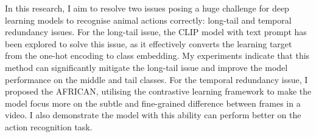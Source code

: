 In this research, I aim to resolve two issues posing a huge challenge for deep learning models to recognise animal actions correctly: long-tail and temporal redundancy issues. For the long-tail issue, the CLIP model with text prompt has been explored to solve this issue, as it effectively converts the learning target from the one-hot encoding to class embedding. My experiments indicate that this method can significantly mitigate the long-tail issue and improve the model performance on the middle and tail classes. For the temporal redundancy issue, I proposed the AFRICAN, utilising the contrastive learning framework to make the model focus more on the subtle and fine-grained difference between frames in a video. I also demonstrate the model with this ability can perform better on the action recognition task.